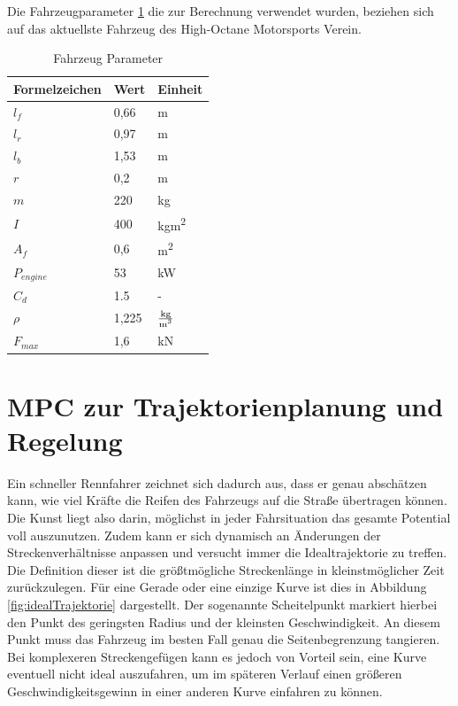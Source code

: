\documentclass{like}
\begin{document}
Die Fahrzeugparameter \ref{vehicleParam} die zur Berechnung verwendet wurden, beziehen sich auf das aktuellste Fahrzeug des High-Octane Motorsports Verein.

\begin{table}[]
	\centering
	\caption{Fahrzeug Parameter}
	\begin{tabular}{l|l|l}
		\hline
		Formelzeichen	& Wert & Einheit \\ \hline
		\(l_f\)	&	0,66 & m\\
		\(l_r\)	&	0,97 & m\\
		\(l_b\)	&	1,53 & m \\
		\(r\)	&	0,2 & m \\
		\(m\)	&  	220 & kg\\
		\(I\)	&  	400 & kgm\textsuperscript{2}\\
		\(A_f\)	&  	0,6 & m\textsuperscript{2}\\
		\(P_{engine}\) &  53 & kW\\
		\(C_d\)	&  	1.5 & - \\
		\(\rho\)	&  	1,225 & $\frac{\text{kg}}{\text{m\textsuperscript{3}}}$\\
		\(F_{max}\)	&  	1,6 & kN \\ 
	\end{tabular}
	\label{vehicleParam}
\end{table}



\chapter{MPC zur Trajektorienplanung und Regelung}

Ein schneller Rennfahrer zeichnet sich dadurch aus, dass er genau abschätzen kann, wie viel Kräfte die Reifen des Fahrzeugs auf die Straße übertragen können. Die Kunst liegt also darin, möglichst in jeder Fahrsituation das gesamte Potential voll auszunutzen. Zudem kann er sich dynamisch an Änderungen der Streckenverhältnisse anpassen und versucht immer die Idealtrajektorie zu treffen. Die Definition dieser ist die größtmögliche Streckenlänge in kleinstmöglicher Zeit zurückzulegen. Für eine Gerade oder eine einzige Kurve ist dies in Abbildung \ref{fig:idealTrajektorie} dargestellt. Der sogenannte Scheitelpunkt markiert hierbei den Punkt des geringsten Radius und der kleinsten Geschwindigkeit. An diesem Punkt muss das Fahrzeug im besten Fall genau die Seitenbegrenzung tangieren. 
Bei komplexeren Streckengefügen kann es jedoch von Vorteil sein, eine Kurve eventuell nicht ideal auszufahren, um im späteren Verlauf einen größeren Geschwindigkeitsgewinn in einer anderen Kurve einfahren zu können.
\end{document}
